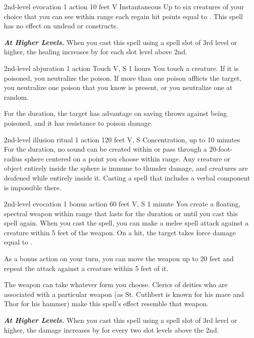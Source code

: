 \documentclass[10pt,twoside,twocolumn,openany]{book}
\newcommand{\castingModifier}{3}
\newcommand\impact[1]{
	\textbf{\textit{#1}}
}
\begin{document}
{2nd-level evocation}
{\color{action}1 action}
{10 feet}
{V}
{Instantaneous}
%
Up to six creatures of your choice that you can see within range each regain hit points equal to \dice{2d8 + \castingModifier}. This spell has no effect on undead or constructs.

\impact{At Higher Levels.} When you cast this spell using a spell slot of 3rd level or higher, the healing increases by
 for each slot level above 2nd.

{2nd-level abjuration}
{\color{action}1 action}
{Touch}
{V, S}
{1 hours}
%
You touch a creature. If it is poisoned, you neutralize the poison. If more than one poison afflicts the target, you neutralize one poison that you know is present, or you neutralize one at random.

For the duration, the target has advantage on saving throws against being poisoned, and it has resistance to poison damage.

{2nd-level illusion {\color{ritual} ritual}}
{\color{action}1 action}
{120 feet}
{V, S}
{{\color{concentration}Concentration}, up to 10 minutes}
%
For the duration, no sound can be created within or pass through a 20-foot-radius sphere centered on a point you choose within range. Any creature or object entirely inside the sphere is immune to thunder damage, and creatures are deafened while entirely inside it. Casting a spell that includes a verbal component is impossible there.

{2nd-level evocation}
{\color{bonusaction}1 bonus action}
{60 feet}
{V, S}
{1 minute}
%
You create a floating, spectral weapon within range that lasts for the duration or until you cast this spell again. When you cast the spell, you can make a melee spell attack against a creature within 5 feet of the weapon. On a hit, the target takes force damage equal to \dice{1d8 + \castingModifier}.

As a bonus action on your turn, you can move the weapon up to 20 feet and repeat the attack against a creature within 5 feet of it.

The weapon can take whatever form you choose. Clerics of deities who are associated with a particular weapon (as St. Cuthbert is known for his mace and Thor for his hammer) make this spell's effect resemble that weapon.

\impact{At Higher Levels.} When you cast this spell using a spell slot of 3rd level or higher, the damage increases by  for every two slot levels above the 2nd.
\end{document}
